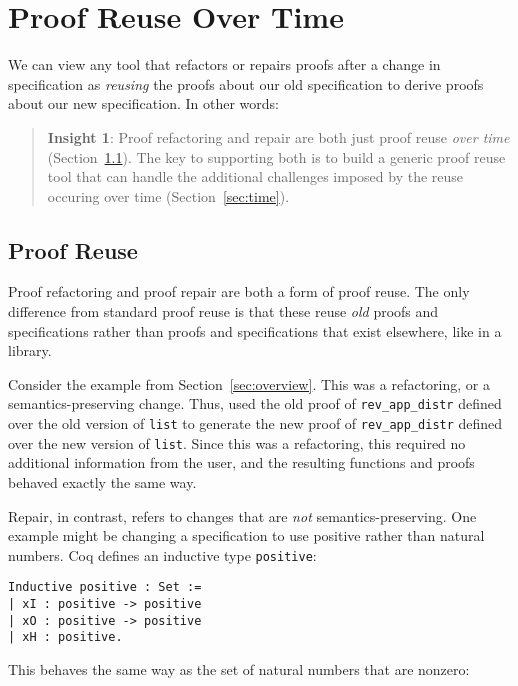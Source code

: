 \section{Proof Reuse Over Time}
\label{sec:key1}

We can view any tool that refactors or repairs proofs after a change in specification
as \textit{reusing} the proofs about our old specification to derive proofs about our new specification.
In other words:

\begin{quote}
\textbf{Insight 1}:
Proof refactoring and repair are both just 
proof reuse %
\textit{over time} (Section~\ref{sec:reuse}). The key to supporting both is to build a generic proof reuse
tool that can handle the additional challenges imposed by the reuse occuring over time (Section~\ref{sec:time}). 
\end{quote}

\subsection{Proof Reuse}
\label{sec:reuse}

Proof refactoring and proof repair are both a form of proof reuse.
The only difference from standard proof reuse is that these reuse \textit{old} proofs and
specifications rather than proofs and specifications that exist elsewhere, like in a library.

Consider the example from Section~\ref{sec:overview}. This was a refactoring, or a semantics-preserving change.
Thus, \toolname used the old proof of \lstinline{rev_app_distr} defined over the old version of \lstinline{list}
to generate the new proof of \lstinline{rev_app_distr} defined over the new version of \lstinline{list}.
Since this was a refactoring, this required no additional information from the user, and the resulting functions
and proofs behaved exactly the same way.

Repair, in contrast, refers to changes that are \textit{not} semantics-preserving.
One example might be changing a specification to use positive rather than natural numbers.
Coq defines an inductive type \lstinline{positive}:

\begin{lstlisting}
Inductive positive : Set :=
| xI : positive -> positive
| xO : positive -> positive
| xH : positive.
\end{lstlisting}
This behaves the same way as the set of natural numbers that are nonzero:

